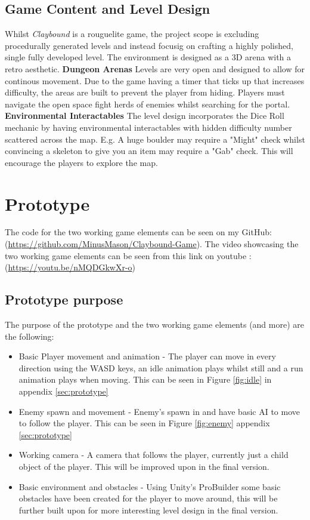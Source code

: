 \documentclass[progress]{cmpreport}
\begin{document}
\subsection{Game Content and Level Design} 
Whilst \emph{Claybound} is a rouguelite game, the project scope is excluding procedurally generated levels and instead focusig on crafting a highly polished, single fully developed level. The environment is designed as a 3D arena with a retro aesthetic.
\newline 
\newline 
\textbf{Dungeon Arenas}
\newline
Levels are very open and designed to allow for continous movement. Due to the game having a timer that ticks up that increases difficulty, the areas are built to prevent the player from hiding. Players must navigate the open space fight herds of enemies whilst searching for the portal.
\newline 
\newline 
\textbf{Environmental Interactables}
\newline
The level design incorporates the Dice Roll mechanic by having environmental interactables with hidden difficulty number scattered across the map. 
E.g. A huge boulder may require a "Might" check whilst convincing a skeleton to give you an item may require a "Gab" check. This will encourage the players to explore the map.

\clearpage

\section{Prototype}
The code for the two working game elements can be seen on my GitHub: (\url{https://github.com/MinusMason/Claybound-Game}).
\newline
The video showcasing the two working game elements can be seen from this link on youtube : (\url{https://youtu.be/nMQDGkwXr-o})
\subsection{Prototype purpose}
The purpose of the prototype and the two working game elements (and more) are the following:
\begin{itemize}
    \item Basic Player movement and animation - The player can move in every direction using the WASD keys, an idle animation plays whilst still and a run animation plays when moving. This can be seen in Figure \ref{fig:idle} in appendix \ref{sec:prototype}
    \item Enemy spawn and movement - Enemy's spawn in and have basic AI to move to follow the player. This can be seen in Figure \ref{fig:enemy} appendix \ref{sec:prototype}
    \item Working camera - A camera that follows the player, currently just a child object of the player. This will be improved upon in the final version.
    \item Basic environment and obstacles - Using Unity's ProBuilder some basic obstacles have been created for the player to move around, this will be further built upon for more interesting level design in the final version.
\end{itemize}
\end{document}
